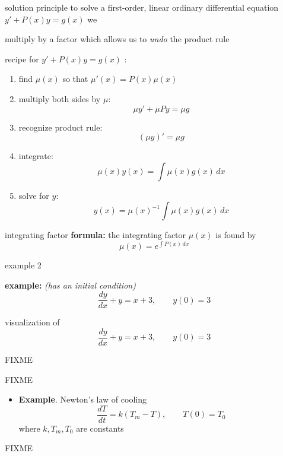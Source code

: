 \documentclass{beamer}
\begin{document}
\begin{frame}{solution principle}
to solve a first-order, linear ordinary differential equation $y' + P(x) y = g(x)$ we

 \alert{multiply by a factor which allows us to \emph{undo} the product rule}
\end{frame}


\begin{frame}{recipe}
for $y' + P(x) y = g(x)$ :

\bigskip
\begin{enumerate}
\item find $\mu(x)$ so that $\mu'(x) = P(x) \mu(x)$
\item multiply both sides by $\mu$:
    $$\mu y' + \mu P y = \mu g$$
\item recognize product rule:
    $$(\mu y)' = \mu g$$
\item integrate:
    $$\mu(x) y(x) = \int \mu(x) g(x)\,dx$$
\item solve for $y$:
    $$y(x) = \mu(x)^{-1} \int \mu(x) g(x)\,dx$$
\end{enumerate}
\end{frame}


\begin{frame}{integrating factor}
\noindent \textbf{formula:}  the \alert{integrating factor} $\mu(x)$ is found by
    $$\mu(x) = e^{\int P(x)\,dx}$$
\end{frame}


\begin{frame}{example 2}

\textbf{example:}  \emph{(has an initial condition)}
        $$\frac{dy}{dx} + y = x+3, \qquad y(0)=3$$

\vspace{60mm}
\end{frame}


\begin{frame}
visualization of
        $$\frac{dy}{dx} + y = x+3, \qquad y(0)=3$$

\vspace{10mm}
FIXME %

FIXME %
\end{frame}


\begin{frame}
\begin{itemize}
    \item \textbf{Example}.  Newton's law of cooling
        $$\frac{dT}{dt} = k (T_m - T), \qquad T(0)=T_0$$
    where $k,T_m,T_0$ are constants
\end{itemize}

\vspace{5mm}
\hfill FIXME %
\end{frame}
\end{document}
